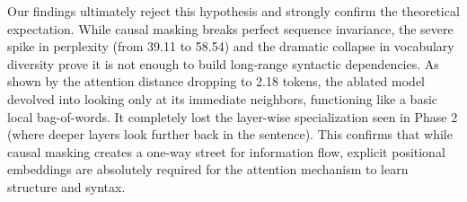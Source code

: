 \documentclass[11pt,a4paper]{article}
\begin{document}
Our findings ultimately reject this hypothesis and strongly confirm the theoretical expectation. While causal masking breaks perfect sequence invariance, the severe spike in perplexity (from 39.11 to 58.54) and the dramatic collapse in vocabulary diversity prove it is not enough to build long-range syntactic dependencies. As shown by the attention distance dropping to 2.18 tokens, the ablated model devolved into looking only at its immediate neighbors, functioning like a basic local bag-of-words. It completely lost the layer-wise specialization seen in Phase 2 (where deeper layers look further back in the sentence). This confirms that while causal masking creates a one-way street for information flow, explicit positional embeddings are absolutely required for the attention mechanism to learn structure and syntax.
\end{document}
